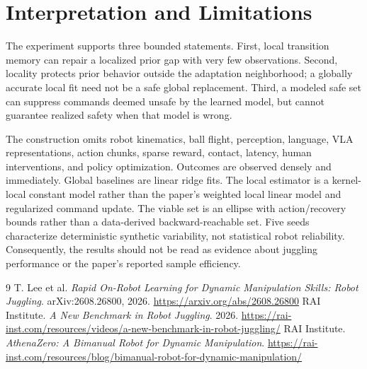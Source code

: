 \documentclass[11pt]{article}
\begin{document}
\section{Interpretation and Limitations}

The experiment supports three bounded statements. First, local transition memory can repair a localized prior gap with very few observations. Second, locality protects prior behavior outside the adaptation neighborhood; a globally accurate local fit need not be a safe global replacement. Third, a modeled safe set can suppress commands deemed unsafe by the learned model, but cannot guarantee realized safety when that model is wrong.

The construction omits robot kinematics, ball flight, perception, language, VLA representations, action chunks, sparse reward, contact, latency, human interventions, and policy optimization. Outcomes are observed densely and immediately. Global baselines are linear ridge fits. The local estimator is a kernel-local constant model rather than the paper's weighted local linear model and regularized command update. The viable set is an ellipse with action/recovery bounds rather than a data-derived backward-reachable set. Five seeds characterize deterministic synthetic variability, not statistical robot reliability. Consequently, the results should not be read as evidence about juggling performance or the paper's reported sample efficiency.

\begin{thebibliography}{9}
 T. Lee et al. \emph{Rapid On-Robot Learning for Dynamic Manipulation Skills: Robot Juggling}. arXiv:2608.26800, 2026. \url{https://arxiv.org/abs/2608.26800}
 RAI Institute. \emph{A New Benchmark in Robot Juggling}. 2026. \url{https://rai-inst.com/resources/videos/a-new-benchmark-in-robot-juggling/}
 RAI Institute. \emph{AthenaZero: A Bimanual Robot for Dynamic Manipulation}. \url{https://rai-inst.com/resources/blog/bimanual-robot-for-dynamic-manipulation/}
\end{thebibliography}
\end{document}
